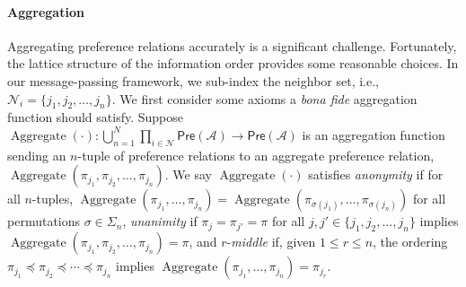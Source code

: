 \documentclass[conference]{ieeeconf}
\renewcommand{\preceq}{\preccurlyeq}
\newcommand{\N}{\mathcal{N}}
\newcommand{\A}{\mathcal{A}}
\newcommand{\Pref}{\mathsf{Pre}}
\renewcommand{\leq}{\leqslant}
\DeclareMathOperator{\Aggregate}{Aggregate}
\DeclareMathOperator{\Permute}{Permute}
\begin{document}
\paragraph{Aggregation}
Aggregating preference relations accurately is a significant challenge. Fortunately, the lattice structure of the information order provides some reasonable choices. In our message-passing framework, we sub-index the neighbor set, i.e., $\N_i = \{j_1,j_2,\dots,j_n\}$. We first consider some axioms a \emph{bona fide} aggregation function should satisfy. Suppose $\Aggregate(\cdot): \bigcup_{n =1}^{N} \prod_{i \in \N}  \Pref(\A) \to \Pref(\A)$ is an aggregation function sending an $n$-tuple of preference relations to an aggregate preference relation, $\Aggregate(\pi_{j_1},\pi_{j_2}, \dots, \pi_{j_n})$. We say $\Aggregate(\cdot)$ satisfies \emph{anonymity} if for all $n$-tuples, $\Aggregate\left( \pi_{j_1},\dots,\pi_{j_n}\right) = \Aggregate\left(\pi_{\sigma(j_1)},\dots,\pi_{\sigma(j_n)}\right)$ for all permutations $\sigma \in \Sigma_n$,
 \emph{unanimity} if $\pi_{j} = \pi_{j'} = \pi$ for all $j, j' \in \{j_1,j_2,\dots,j_n\}$ implies $\Aggregate\left( \pi_{j_1},\pi_{j_2},\dots,\pi_{j_n}\right) = \pi$,
and $r$-\emph{middle} if, given $1 \leq r \leq n$, the ordering $\pi_{j_1} \preceq \pi_{j_2} \preceq \cdots \preceq \pi_{j_n}$ implies $\Aggregate\left( \pi_{j_1},\dots,\pi_{j_n}\right) = \pi_{j_r}$.
\end{document}
